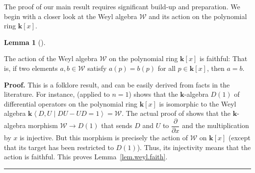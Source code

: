 \documentclass[numbers=enddot,12pt,final,onecolumn,notitlepage]{scrartcl}%
\theoremstyle{definition}
\newtheorem{lem}[theo]{Lemma}
\newenvironment{lemma}[1][]
{\begin{lem}[#1]\begin{leftbar}}
{\end{leftbar}\end{lem}}
\newenvironment{proof}[1][Proof]{\noindent\textbf{#1.} }{\ \rule{0.5em}{0.5em}}
\newcommand{\W}{\mathcal{W}}
\newcommand{\kk}{\mathbf{k}}
\begin{document}
The proof of our main result requires significant build-up and preparation.
We begin with a closer look at the Weyl algebra $\W$ and its action on the polynomial ring $\kk\left[  x\right]  $.

\begin{lemma}
\label{lem.weyl.faith}
The action of the Weyl algebra $\W$ on the
polynomial ring $\kk\left[  x\right]  $ is faithful: That is, if two
elements $a, b\in\W$ satisfy $a\left(  p\right)  = b\left(p\right)$ for all
$p\in\kk\left[  x\right]  $, then $a = b$.
\end{lemma}

\begin{proof}
This is a folklore result, and can be easily derived from facts in the literature.
For instance, \cite[Theorem 5.11]{Milici17} (applied to $n = 1$) shows that the $\kk$-algebra $D\left(1\right)$ of differential operators on the polynomial ring $\kk\left[x\right]$ is isomorphic to the Weyl algebra $\kk\left<D,U \mid DU - UD = 1\right> = \W$.
The actual proof of \cite[Theorem 5.11]{Milici17} shows that the $\kk$-algebra morphism $\W \to D\left(1\right)$ that sends $D$ and $U$ to $\dfrac{\partial}{\partial x}$ and the multiplication by $x$ is injective.
But this morphism is precisely the action of $\W$ on $\kk\left[x\right]$ (except that its target has been restricted to $D\left(1\right)$).
Thus, its injectivity means that the action is faithful.
This proves Lemma~\ref{lem.weyl.faith}.
\end{proof}
\end{document}
